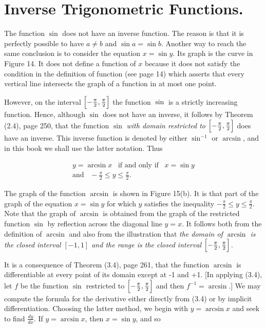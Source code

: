\section{Inverse Trigonometric Functions.} 
The function $\sin$ does not have an inverse function. The reason is that it is perfectly possible to have $a \neq b$ and $\sin a = \sin b$. Another way to reach the same conclusion is to consider the equation $x = \sin y$. Its graph is the curve in Figure 14. It does not define a function of $x$ because it does not satisfy the condition in the definition of function (see page 14) which asserts that every vertical line intersects the graph of a function in at most one point.


However, on the interval $\Bigl[-\frac{\pi}{2}, \frac{\pi}{2}\Bigr]$ the function $\sin$ is a strictly increasing function. Hence, although $\sin$ does not have an inverse, it follows by Theorem (2.4), page 250,
that the function $\sin$ \textit{with domain restricted to} $\Bigl[-\frac{\pi}{2}, \frac{\pi}{2}\Bigr]$ does have an inverse. This inverse function is denoted by either $\sin^{-1}$ or $\arcsin$, and in this book we shall use the latter notation.  Thus

$$
\begin{array}{c}
 y = \arcsin x \;\;\;\mbox{if and only if}\;\;\;  x = \sin y \\ 
\mbox{and}\;\;\;  -\frac{\pi}{2} \leq y \leq \frac{\pi}{2}.
\end{array}
$$

The graph of the function $\arcsin$ is shown in Figure 15(b). It is that part of the graph of the
equation $x = \sin y$ for which $y$ satisfies the inequality $-\frac{\pi}{2} \leq y \leq \frac{\pi}{2}$. Note that the graph of $\arcsin$ is obtained from the graph of the restricted function $\sin$ by reflection across the diagonal line $y = x$. It follows both from the definition of $\arcsin$ and also from the illustration that \textit{the domain of $\arcsin$ is the closed interval $[ -1, 1]$ and the range is the closed interval $\Bigl[-\frac{\pi}{2}, \frac{\pi}{2}\Bigr]$.}


It is a consequence of Theorem (3.4), page 261, that the function $\arcsin$ is differentiable at every point of its domain except at -1 and +1. [In applying (3.4), let $f$ be the function $\sin$ restricted to $\Bigl[-\frac{\pi}{2}, \frac{\pi}{2}\Bigr]$ and then $f^{-1} = \arcsin$.] We may compute the formula for the derivative either directly from (3.4) or by implicit differentiation. Choosing the latter method, we begin with $y = \arcsin x$ and seek to find $\frac{dy}{dx}$. If $y = \arcsin x$, then $x = \sin y$, and so

